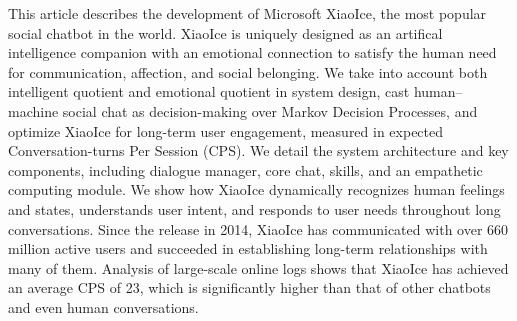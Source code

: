 This article describes the development of Microsoft XiaoIce, the most popular social chatbot in the world. XiaoIce is uniquely designed as an artifical intelligence companion with an emotional connection to satisfy the human need for communication, affection, and social belonging. We take into account both intelligent quotient and emotional quotient in system design, cast human–machine social chat as decision-making over Markov Decision Processes, and optimize XiaoIce for long-term user engagement, measured in expected Conversation-turns Per Session (CPS). We detail the system architecture and key components, including dialogue manager, core chat, skills, and an empathetic computing module. We show how XiaoIce dynamically recognizes human feelings and states, understands user intent, and responds to user needs throughout long conversations. Since the release in 2014, XiaoIce has communicated with over 660 million active users and succeeded in establishing long-term relationships with many of them. Analysis of large-scale online logs shows that XiaoIce has achieved an average CPS of 23, which is significantly higher than that of other chatbots and even human conversations.